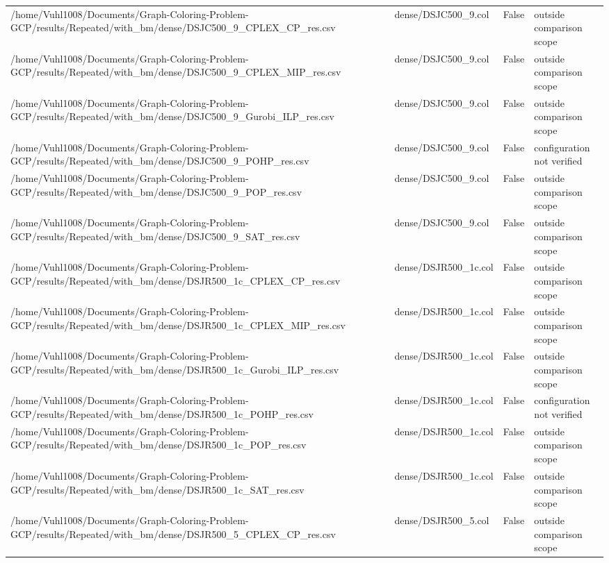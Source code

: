 \begin{table}[htbp]
\begin{tabular}{llll}
/home/Vuhl1008/Documents/Graph-Coloring-Problem-GCP/results/Repeated/with\_bm/dense/DSJC500\_9\_CPLEX\_CP\_res.csv & dense/DSJC500\_9.col & False & outside comparison scope \\
/home/Vuhl1008/Documents/Graph-Coloring-Problem-GCP/results/Repeated/with\_bm/dense/DSJC500\_9\_CPLEX\_MIP\_res.csv & dense/DSJC500\_9.col & False & outside comparison scope \\
/home/Vuhl1008/Documents/Graph-Coloring-Problem-GCP/results/Repeated/with\_bm/dense/DSJC500\_9\_Gurobi\_ILP\_res.csv & dense/DSJC500\_9.col & False & outside comparison scope \\
/home/Vuhl1008/Documents/Graph-Coloring-Problem-GCP/results/Repeated/with\_bm/dense/DSJC500\_9\_POHP\_res.csv & dense/DSJC500\_9.col & False & configuration not verified \\
/home/Vuhl1008/Documents/Graph-Coloring-Problem-GCP/results/Repeated/with\_bm/dense/DSJC500\_9\_POP\_res.csv & dense/DSJC500\_9.col & False & outside comparison scope \\
/home/Vuhl1008/Documents/Graph-Coloring-Problem-GCP/results/Repeated/with\_bm/dense/DSJC500\_9\_SAT\_res.csv & dense/DSJC500\_9.col & False & outside comparison scope \\
/home/Vuhl1008/Documents/Graph-Coloring-Problem-GCP/results/Repeated/with\_bm/dense/DSJR500\_1c\_CPLEX\_CP\_res.csv & dense/DSJR500\_1c.col & False & outside comparison scope \\
/home/Vuhl1008/Documents/Graph-Coloring-Problem-GCP/results/Repeated/with\_bm/dense/DSJR500\_1c\_CPLEX\_MIP\_res.csv & dense/DSJR500\_1c.col & False & outside comparison scope \\
/home/Vuhl1008/Documents/Graph-Coloring-Problem-GCP/results/Repeated/with\_bm/dense/DSJR500\_1c\_Gurobi\_ILP\_res.csv & dense/DSJR500\_1c.col & False & outside comparison scope \\
/home/Vuhl1008/Documents/Graph-Coloring-Problem-GCP/results/Repeated/with\_bm/dense/DSJR500\_1c\_POHP\_res.csv & dense/DSJR500\_1c.col & False & configuration not verified \\
/home/Vuhl1008/Documents/Graph-Coloring-Problem-GCP/results/Repeated/with\_bm/dense/DSJR500\_1c\_POP\_res.csv & dense/DSJR500\_1c.col & False & outside comparison scope \\
/home/Vuhl1008/Documents/Graph-Coloring-Problem-GCP/results/Repeated/with\_bm/dense/DSJR500\_1c\_SAT\_res.csv & dense/DSJR500\_1c.col & False & outside comparison scope \\
/home/Vuhl1008/Documents/Graph-Coloring-Problem-GCP/results/Repeated/with\_bm/dense/DSJR500\_5\_CPLEX\_CP\_res.csv & dense/DSJR500\_5.col & False & outside comparison scope \\

\end{tabular}
\end{table}

